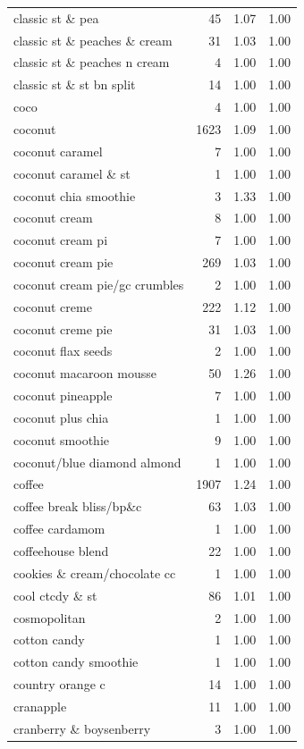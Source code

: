 \begin{table}
\begin{tabular}{lrrr}
classic st \& pea & 45 & 1.07 & 1.00 \\
classic st \& peaches \& cream & 31 & 1.03 & 1.00 \\
classic st \& peaches n cream & 4 & 1.00 & 1.00 \\
classic st \& st bn split & 14 & 1.00 & 1.00 \\
coco & 4 & 1.00 & 1.00 \\
coconut & 1623 & 1.09 & 1.00 \\
coconut caramel & 7 & 1.00 & 1.00 \\
coconut caramel \& st & 1 & 1.00 & 1.00 \\
coconut chia smoothie & 3 & 1.33 & 1.00 \\
coconut cream & 8 & 1.00 & 1.00 \\
coconut cream pi & 7 & 1.00 & 1.00 \\
coconut cream pie & 269 & 1.03 & 1.00 \\
coconut cream pie/gc crumbles & 2 & 1.00 & 1.00 \\
coconut creme & 222 & 1.12 & 1.00 \\
coconut creme pie & 31 & 1.03 & 1.00 \\
coconut flax seeds & 2 & 1.00 & 1.00 \\
coconut macaroon mousse & 50 & 1.26 & 1.00 \\
coconut pineapple & 7 & 1.00 & 1.00 \\
coconut plus chia & 1 & 1.00 & 1.00 \\
coconut smoothie & 9 & 1.00 & 1.00 \\
coconut/blue diamond almond & 1 & 1.00 & 1.00 \\
coffee & 1907 & 1.24 & 1.00 \\
coffee break bliss/bp\&c & 63 & 1.03 & 1.00 \\
coffee cardamom & 1 & 1.00 & 1.00 \\
coffeehouse blend & 22 & 1.00 & 1.00 \\
cookies \& cream/chocolate cc & 1 & 1.00 & 1.00 \\
cool ctcdy \& st & 86 & 1.01 & 1.00 \\
cosmopolitan & 2 & 1.00 & 1.00 \\
cotton candy & 1 & 1.00 & 1.00 \\
cotton candy smoothie & 1 & 1.00 & 1.00 \\
country orange c & 14 & 1.00 & 1.00 \\
cranapple & 11 & 1.00 & 1.00 \\
cranberry \& boysenberry & 3 & 1.00 & 1.00 \\

\end{tabular}
\end{table}
